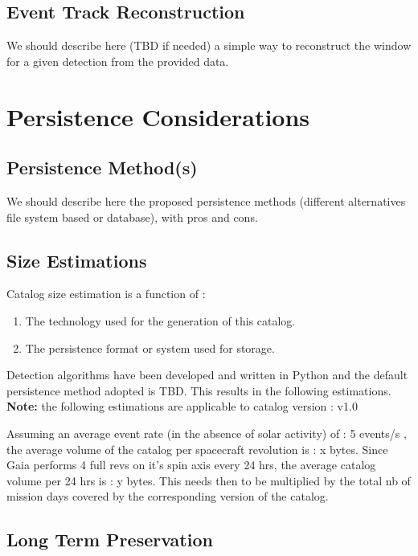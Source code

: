 \documentclass[a4paper, 11pt]{article}
\newcommand{\dmVersion}{v1.0}
\begin{document}
\subsection{Event Track Reconstruction}

We should describe here (TBD if needed) a simple way to reconstruct the window for a given detection from the provided data.

\section{Persistence Considerations}
\label{sec:persist}
\subsection{Persistence Method(s)}

We should describe here the proposed persistence methods (different alternatives file system based or database), with pros and cons.

\subsection{Size Estimations}

Catalog size estimation is a function of :
\begin{enumerate}
\item The technology used for the generation of this catalog. 
\item The persistence format or system used for storage.
\end{enumerate}

Detection algorithms have been developed and written in Python and the default persistence method adopted is TBD. This results in the following estimations.
\newline
\newline
\textbf{Note:} the following estimations are applicable to catalog version : \dmVersion  
\newline
\newline

Assuming an average event rate (in the absence of solar activity) of : 5 events/s , the average volume of the catalog per spacecraft revolution is : x bytes. Since Gaia performs 4 full revs on it's spin axis every 24 hrs, the average catalog volume per 24 hrs is : y bytes. This needs then to be multiplied by the total nb of mission days covered by the corresponding version of the catalog. 

\subsection{Long Term Preservation}
\end{document}
